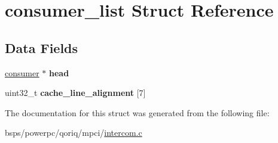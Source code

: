 \hypertarget{structconsumer__list}{}\section{consumer\+\_\+list Struct Reference}
\label{structconsumer__list}
\subsection*{Data Fields}
\begin{DoxyCompactItemize}
\item 
\mbox{\label{structconsumer__list_a8ae4cc9b7a23c8bbca3de3eb31011093}} 
\mbox{\hyperlink{structconsumer}{consumer}} $\ast$ {\bfseries head}
\item 
\mbox{\label{structconsumer__list_a718d3060c9a6a68d13139d9d3cb005c2}} 
uint32\+\_\+t {\bfseries cache\+\_\+line\+\_\+alignment} \mbox{[}7\mbox{]}
\end{DoxyCompactItemize}


The documentation for this struct was generated from the following file\+:\begin{DoxyCompactItemize}
\item 
bsps/powerpc/qoriq/mpci/\mbox{\hyperlink{intercom_8c}{intercom.\+c}}\end{DoxyCompactItemize}
